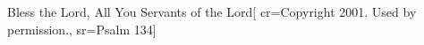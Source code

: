 {Bless the Lord, All You Servants of the Lord}[
    cr={Copyright 2001.  Used by permission.},
    sr={Psalm 134}]
